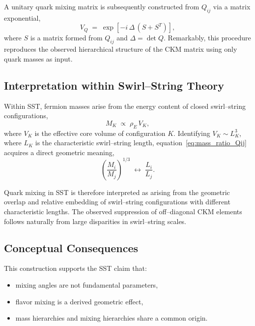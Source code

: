 \documentclass[11pt]{article}
\begin{document}
        A unitary quark mixing matrix is subsequently constructed from $Q_{ij}$ via a
        matrix exponential,
        \begin{equation}
            V_Q \;=\;
            \exp\!\left[-i\,\Delta\,(S+S^T)\right],
        \end{equation}
        where $S$ is a matrix formed from $Q_{ij}$ and $\Delta = \det Q$.
        Remarkably, this procedure reproduces the observed hierarchical structure of
        the CKM matrix using only quark masses as input.

        \subsection{Interpretation within Swirl--String Theory}

            Within SST, fermion masses arise from the energy content of closed
            swirl--string configurations,
            \begin{equation}
                M_K \;\propto\; \rho_{\!E}\, V_K,
            \end{equation}
            where $V_K$ is the effective core volume of configuration $K$.
            Identifying $V_K \sim L_K^3$, where $L_K$ is the characteristic
            swirl--string length, equation~\eqref{eq:mass_ratio_Qij} acquires a direct
            geometric meaning,
            \begin{equation}
                \left(\frac{M_i}{M_j}\right)^{1/3}
                \;\longleftrightarrow\;
                \frac{L_i}{L_j}.
            \end{equation}

            Quark mixing in SST is therefore interpreted as arising from the geometric
            overlap and relative embedding of swirl--string configurations with different
            characteristic lengths. The observed suppression of off--diagonal CKM elements
            follows naturally from large disparities in swirl--string scales.

        \subsection{Conceptual Consequences}

            This construction supports the SST claim that:
            \begin{itemize}
                \item mixing angles are not fundamental parameters,
                \item flavor mixing is a derived geometric effect,
                \item mass hierarchies and mixing hierarchies share a common origin.
            \end{itemize}
\end{document}
